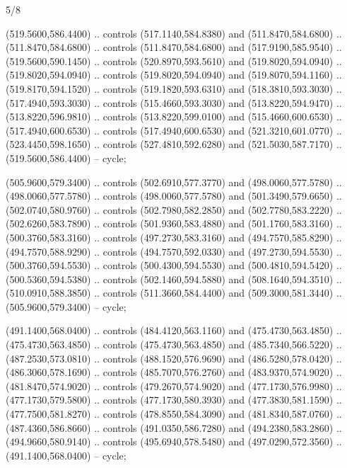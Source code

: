 \begin{flagdescription}{5/8}
\begin{scope}[shift={(m)}]
\begin{scope}[scale=\flagwidth/220,y=0.1mm, x=0.1mm, yscale=-1,shift={(-596,-360)}]
\begin{scope}[cm={{-1.0,0.0,0.0,1.0,(1193.9797,0.0)}}]
\begin{scope}[draw=black,line join=round,line cap=round,line width=0.381\lw]
\begin{scope}[line width=0.534\lw,fill=green]
 (519.5600,586.4400) .. controls (517.1140,584.8380) and
  (511.8470,584.6800) .. (511.8470,584.6800) .. controls (511.8470,584.6800) and
  (517.9190,585.9540) .. (519.5600,590.1450) .. controls (520.8970,593.5610) and
  (519.8020,594.0940) .. (519.8020,594.0940) .. controls (519.8020,594.0940) and
  (519.8070,594.1160) .. (519.8170,594.1520) .. controls (519.1820,593.6310) and
  (518.3810,593.3030) .. (517.4940,593.3030) .. controls (515.4660,593.3030) and
  (513.8220,594.9470) .. (513.8220,596.9810) .. controls (513.8220,599.0100) and
  (515.4660,600.6530) .. (517.4940,600.6530) .. controls (517.4940,600.6530) and
  (521.3210,601.0770) .. (523.4450,598.1650) .. controls (527.4810,592.6280) and
  (521.5030,587.7170) .. (519.5600,586.4400) -- cycle;

 (505.9600,579.3400) .. controls (502.6910,577.3770) and
  (498.0060,577.5780) .. (498.0060,577.5780) .. controls (498.0060,577.5780) and
  (501.3490,579.6650) .. (502.0740,580.9760) .. controls (502.7980,582.2850) and
  (502.7780,583.2220) .. (502.6260,583.7890) .. controls (501.9360,583.4880) and
  (501.1760,583.3160) .. (500.3760,583.3160) .. controls (497.2730,583.3160) and
  (494.7570,585.8290) .. (494.7570,588.9290) .. controls (494.7570,592.0330) and
  (497.2730,594.5530) .. (500.3760,594.5530) .. controls (500.4300,594.5530) and
  (500.4810,594.5420) .. (500.5360,594.5380) .. controls (502.1460,594.5880) and
  (508.1640,594.3510) .. (510.0910,588.3850) .. controls (511.3660,584.4400) and
  (509.3000,581.3440) .. (505.9600,579.3400) -- cycle;

 (491.1400,568.0400) .. controls (484.4120,563.1160) and
  (475.4730,563.4850) .. (475.4730,563.4850) .. controls (475.4730,563.4850) and
  (485.7340,566.5220) .. (487.2530,573.0810) .. controls (488.1520,576.9690) and
  (486.5280,578.0420) .. (486.3060,578.1690) .. controls (485.7070,576.2760) and
  (483.9370,574.9020) .. (481.8470,574.9020) .. controls (479.2670,574.9020) and
  (477.1730,576.9980) .. (477.1730,579.5800) .. controls (477.1730,580.3930) and
  (477.3830,581.1590) .. (477.7500,581.8270) .. controls (478.8550,584.3090) and
  (481.8340,587.0760) .. (487.4360,586.8660) .. controls (491.0350,586.7280) and
  (494.2380,583.2860) .. (494.9660,580.9140) .. controls (495.6940,578.5480) and
  (497.0290,572.3560) .. (491.1400,568.0400) -- cycle;


\end{scope}
\end{scope}
\end{scope}
\end{scope}
\end{scope}
\end{flagdescription}
